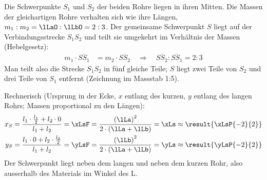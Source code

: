 Die Schwerpunkte $S_1$ und $S_2$ der beiden Rohre liegen in ihren Mitten. Die Massen der gleichartigen Rohre verhalten sich wie ihre Längen, $m_1 : m_2 = \lLaO : \lLbO = 2 : 3$. Der gemeinsame Schwerpunkt $S$ liegt auf der Verbindungsstrecke $S_1S_2$ und teilt sie umgekehrt im Verhältnis der Massen (Hebelgesetz):
\begin{align}
 m_1\cdot\overline{SS_1} &= m_2\cdot\overline{SS_2} \quad\Rightarrow\quad \overline{SS_2} : \overline{SS_1} = 2 : 3
\end{align}
Man teilt also die Strecke $S_1S_2$ in fünf gleiche Teile; $S$ liegt zwei Teile von $S_2$ und drei Teile von $S_1$ entfernt (Zeichnung im Massstab 1:5).

\begin{center}
\end{center}

Rechnerisch (Ursprung in der Ecke, $x$ entlang des kurzen, $y$ entlang des langen Rohrs; Massen proportional zu den Längen):
\begin{align}
 x_S &= \frac{l_1\cdot\frac{l_1}{2} + l_2\cdot 0}{l_1+l_2} = \xLsF = \frac{\left(\lLa\right)^2}{2\cdot\left(\lLa+\lLb\right)} = \xLs \approx \result{\xLsP{-2}{2}} \\
 y_S &= \frac{l_1\cdot 0 + l_2\cdot\frac{l_2}{2}}{l_1+l_2} = \yLsF = \frac{\left(\lLb\right)^2}{2\cdot\left(\lLa+\lLb\right)} = \yLs \approx \result{\yLsP{-2}{2}}
\end{align}
Der Schwerpunkt liegt  neben dem langen und  neben dem kurzen Rohr, also ausserhalb des Materials im Winkel des L.
